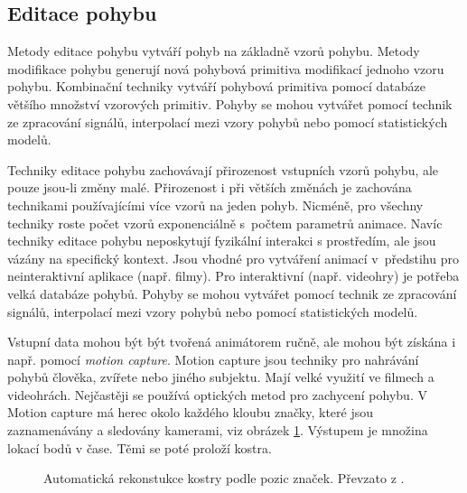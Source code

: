 \subsection{Editace pohybu}
Metody editace pohybu vytváří pohyb na základně vzorů pohybu. Metody modifikace pohybu generují nová pohybová primitiva modifikací jednoho vzoru pohybu. Kombinační techniky vytváří pohybová primitiva pomocí databáze většího množství vzorových primitiv. Pohyby se mohou vytvářet pomocí technik ze zpracování signálů, interpolací mezi vzory pohybů nebo pomocí statistických modelů. 

Techniky editace pohybu zachovávají přirozenost vstupních vzorů pohybu, ale pouze jsou-li změny malé. Přirozenost i při větších změnách je zachována technikami používajícími více vzorů na jeden pohyb. Nicméně, pro všechny techniky roste počet vzorů  exponenciálně s~počtem parametrů animace. Navíc techniky editace pohybu neposkytují fyzikální interakci s prostředím, ale jsou vázány na specifický kontext. Jsou vhodné pro vytváření animací v~předstihu pro neinteraktivní aplikace (např. filmy). Pro interaktivní (např. videohry) je potřeba velká databáze pohybů. Pohyby se mohou vytvářet pomocí technik ze zpracování signálů, interpolací mezi vzory pohybů nebo pomocí statistických modelů.

Vstupní data mohou být být tvořená animátorem ručně, ale mohou být získána i např. pomocí \textit{motion capture}. Motion capture  \cite{motion_capture} jsou techniky pro nahrávání pohybů člověka, zvířete nebo jiného subjektu. Mají velké využití ve filmech a videohrách. Nejčastěji se používá optických metod pro zachycení pohybu. V Motion capture má herec okolo každého kloubu značky, které jsou zaznamenávány a sledovány kamerami, viz obrázek \ref{motion_capture_img}. Výstupem je množina lokací bodů v čase. Těmi se poté proloží kostra.
\begin{figure}[h]
\begin{center}
\caption{Automatická rekonstukce kostry podle pozic značek. Převzato z \cite{motion_capture}.} \label{motion_capture_img}
\end{center}
\end{figure}

